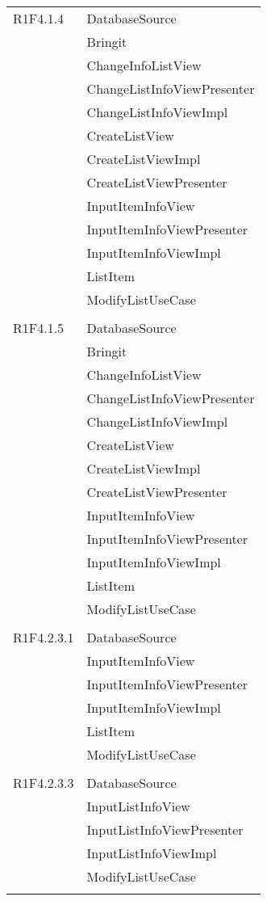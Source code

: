 \begin{center}
\begin{longtable}{|p{7cm}|p{7cm}|}
		R1F4.1.4 & DatabaseSource \\ & Bringit \\ & ChangeInfoListView \\ & ChangeListInfoViewPresenter \\ & ChangeListInfoViewImpl \\ & CreateListView \\ & CreateListViewImpl \\ & CreateListViewPresenter \\ & InputItemInfoView \\ & InputItemInfoViewPresenter \\ & InputItemInfoViewImpl \\ & ListItem \\ & ModifyListUseCase \\ & \\ \hline
		R1F4.1.5 & DatabaseSource \\ & Bringit \\ & ChangeInfoListView \\ & ChangeListInfoViewPresenter \\ & ChangeListInfoViewImpl \\ & CreateListView \\ & CreateListViewImpl \\ & CreateListViewPresenter \\ & InputItemInfoView \\ & InputItemInfoViewPresenter \\ & InputItemInfoViewImpl \\ & ListItem \\ & ModifyListUseCase \\ & \\ \hline
		R1F4.2.3.1 & DatabaseSource \\ & InputItemInfoView \\ & InputItemInfoViewPresenter \\ & InputItemInfoViewImpl \\ & ListItem \\ & ModifyListUseCase \\ & \\ \hline
		R1F4.2.3.3 & DatabaseSource \\ & InputListInfoView \\ & InputListInfoViewPresenter \\ & InputListInfoViewImpl \\ & ModifyListUseCase \\ & \\ \hline

\end{longtable}
\end{center}
